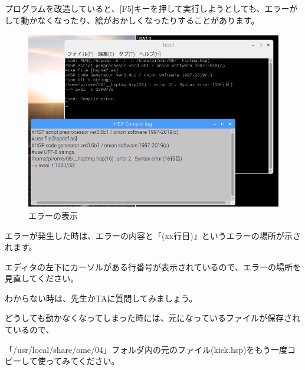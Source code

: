 \begin{description}
    \item {}
\end{description}

プログラムを改造していると、[F5]キーを押して実行しようとしても、エラーがして動かなくなったり、絵がおかしくなったりすることがあります。


\begin{figure}[H]
    \begin{center}
      \includegraphics[keepaspectratio,width=11.324cm,height=7.756cm]{text04-img/text04-img011.png}
      \caption{エラーの表示}
    \end{center}
    \label{fig:prog_menu}
\end{figure}

エラーが発生した時は、エラーの内容と「(xx行目)」というエラーの場所が示されます。

エディタの左下にカーソルがある行番号が表示されているので、エラーの場所を見直してください。

わからない時は、先生かTAに質問してみましょう。

どうしても動かなくなってしまった時には、元になっているファイルが保存されているので、

「/usr/local/share/ome/04」フォルダ内の元のファイル(kick.hsp)をもう一度コピーして使ってみてください。
